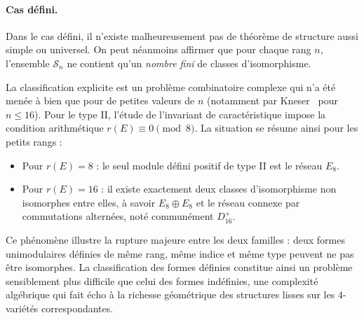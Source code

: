 \paragraph{Cas défini.}
Dans le cas défini, il n'existe malheureusement pas de théorème de structure aussi simple ou universel. On peut néanmoins affirmer que pour chaque rang $n$, l'ensemble $\mathcal{S}_n$ ne contient qu'un \emph{nombre fini} de classes d'isomorphisme. 

La classification explicite est un problème combinatoire complexe qui n'a été menée à bien que pour de petites valeurs de $n$ (notamment par Kneser~\cite{Kneser1957} pour $n \leq 16$). Pour le type II, l'étude de l'invariant de caractéristique impose la condition arithmétique $r(E) \equiv 0 \pmod 8$. La situation se résume ainsi pour les petits rangs :

\begin{proposition}
\label{prop:defII_petits_rangs}
\begin{itemize}
    \item Pour $r(E) = 8$ : le seul module défini positif de type II est le réseau $E_8$.
    \item Pour $r(E) = 16$ : il existe exactement deux classes d'isomorphisme non isomorphes entre elles, à savoir $E_8 \oplus E_8$ et le réseau connexe par commutations alternées, noté communément $D_{16}^+$.
\end{itemize}
\end{proposition}

Ce phénomène illustre la rupture majeure entre les deux familles : deux formes unimodulaires définies de même rang, même indice et même type peuvent ne pas être isomorphes. La classification des formes définies constitue ainsi un problème sensiblement plus difficile que celui des formes indéfinies, une complexité algébrique qui fait écho à la richesse géométrique des structures lisses sur les $4$-variétés correspondantes.

